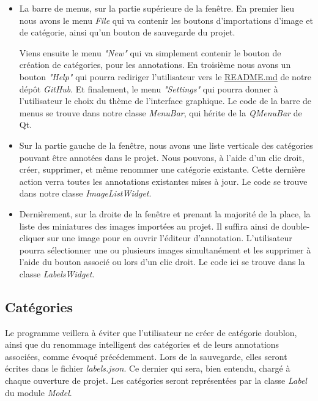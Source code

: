 \documentclass{rapport}
\begin{document}
            \begin{itemize}
                \item La barre de menus, sur la partie supérieure de la fenêtre. En premier lieu nous avons le menu \textit{File} qui va contenir les boutons d'importations d'image et de catégorie, ainsi qu'un bouton de sauvegarde du projet.
    
                Viens ensuite le menu \textit{"New"} qui va simplement contenir le bouton de création de catégories, pour les annotations. En troisième nous avons un bouton \textit{"Help"} qui pourra rediriger l'utilisateur vers le \href{https://github.com/Brotherta/Facial-Mask-Recognition/blob/main/README.md}{README.md} de notre dépôt \textit{GitHub}. Et finalement, le menu \textit{"Settings"} qui pourra donner à l'utilisateur le choix du thème de l'interface graphique. Le code de la barre de menus se trouve dans notre classe \textit{MenuBar}, qui hérite de la \textit{QMenuBar} de Qt.
    
                \item Sur la partie gauche de la fenêtre, nous avons une liste verticale des catégories pouvant être annotées dans le projet. Nous pouvons, à l'aide d'un clic droit, créer, supprimer, et même renommer une catégorie existante. Cette dernière action verra toutes les annotations existantes mises à jour. Le code se trouve dans notre classe \textit{ImageListWidget}.
    
                \item Dernièrement, sur la droite de la fenêtre et prenant la majorité de la place, la liste des miniatures des images importées au projet. Il suffira ainsi de double-cliquer sur une image pour en ouvrir l'éditeur d'annotation. L'utilisateur pourra sélectionner une ou plusieurs images simultanément et les supprimer à l'aide du bouton associé ou lors d'un clic droit. Le code ici se trouve dans la classe \textit{LabelsWidget}.
            \end{itemize}
        
        \subsection{Catégories}
        Le programme veillera à éviter que l'utilisateur ne créer de catégorie doublon, ainsi que du renommage intelligent des catégories et de leurs annotations associées, comme évoqué précédemment. Lors de la sauvegarde, elles seront écrites dans le fichier \textit{labels.json}. Ce dernier qui sera, bien entendu, chargé à chaque ouverture de projet. Les catégories seront représentées par la classe \textit{Label} du module \textit{Model}.
        
\end{document}
